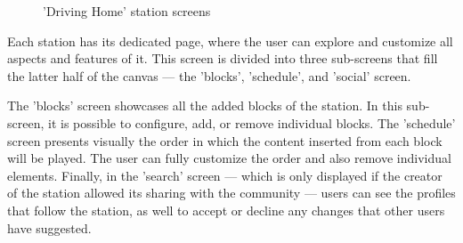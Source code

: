 \begin{figure}[htbp]
	\centering
	 \qquad
	 \qquad
	\caption{'Driving Home' station screens}
	\label{fig:mfp1}
\end{figure}



Each station has its dedicated page, where the user can explore and customize all aspects and features of it. This screen is divided into three sub-screens that fill the latter half of the canvas — the 'blocks', 'schedule', and 'social' screen.

The 'blocks' screen showcases all the added blocks of the station. In this sub-screen, it is possible to configure, add, or remove individual blocks. The 'schedule' screen presents visually the order in which the content inserted from each block will be played. The user can fully customize the order and also remove individual elements. Finally, in the 'search' screen — which is only displayed if the creator of the station allowed its sharing with the community — users can see the profiles that follow the station, as well to accept or decline any changes that other users have suggested.



